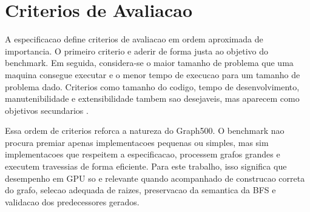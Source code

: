 \section{Criterios de Avaliacao}

A especificacao define criterios de avaliacao em ordem aproximada de importancia.
O primeiro criterio e aderir de forma justa ao objetivo do benchmark. Em seguida,
considera-se o maior tamanho de problema que uma maquina consegue executar e o
menor tempo de execucao para um tamanho de problema dado. Criterios como tamanho
do codigo, tempo de desenvolvimento, manutenibilidade e extensibilidade tambem
sao desejaveis, mas aparecem como objetivos secundarios \cite{graph500spec}.

Essa ordem de criterios reforca a natureza do Graph500. O benchmark nao procura
premiar apenas implementacoes pequenas ou simples, mas sim implementacoes que
respeitem a especificacao, processem grafos grandes e executem travessias de
forma eficiente. Para este trabalho, isso significa que desempenho em GPU so e
relevante quando acompanhado de construcao correta do grafo, selecao adequada de
raizes, preservacao da semantica da BFS e validacao dos predecessores gerados.


